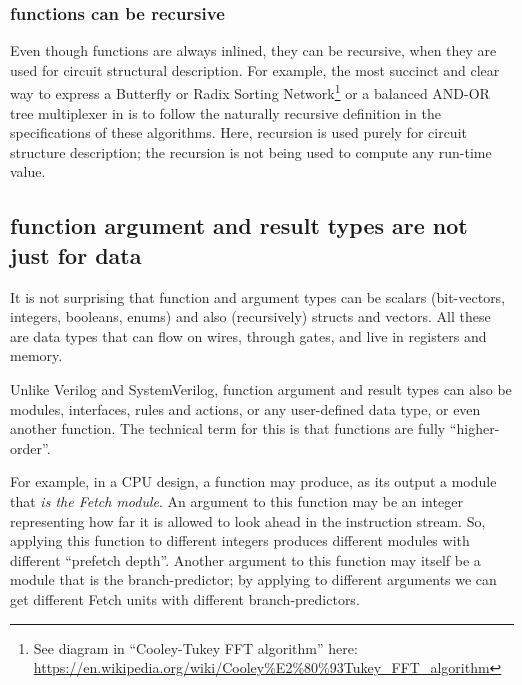 
\subsubsection{{\BSV} functions can be recursive}


Even though {\BSV} functions are always inlined, they can be
recursive, when they are used for circuit structural description.  For
example, the most succinct and clear way to express a Butterfly or
Radix Sorting Network\footnote{See diagram in ``Cooley-Tukey FFT
algorithm'' here:
\url{https://en.wikipedia.org/wiki/Cooley\%E2\%80\%93Tukey_FFT_algorithm}}
or a balanced AND-OR tree multiplexer in {\BSV} is to follow the
naturally recursive definition in the specifications of these
algorithms.  Here, recursion is used purely for circuit structure
description; the recursion is not being used to compute any run-time
value.


\subsection{{\BSV} function argument and result types are not just for data}


It is not surprising that {\BSV} function and argument types can be
scalars (bit-vectors, integers, booleans, enums) and also
(recursively) structs and vectors.  All these are data types that can
flow on wires, through gates, and live in registers and memory.

Unlike Verilog and SystemVerilog, {\BSV} function argument and result
types can also be modules, interfaces, rules and actions, or any
user-defined data type, or even another function.  The technical term
for this is that {\BSV} functions are fully ``higher-order''.

For example, in a CPU design, a {\BSV} function may produce, as its
output a module that \emph{is the Fetch module}.  An argument to this
function may be an integer representing how far it is allowed to look
ahead in the instruction stream.  So, applying this function to
different integers produces different modules with different
``prefetch depth''.  Another argument to this function may itself be a
module that is the branch-predictor; by applying to different
arguments we can get different Fetch units with different
branch-predictors.

